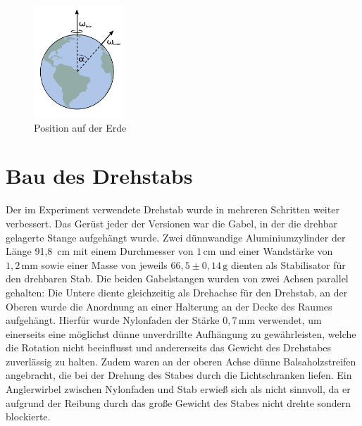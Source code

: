 \documentclass[11pt]{scrartcl}
\newcommand{\unit}[1]{\ensuremath{\,\mathrm{#1}}} %
\begin{document}
\begin{figure}[ht]
\begin{center}
\includegraphics[width=0.3\textwidth]{welt.pdf}
\end{center}
\vspace{-1.5\baselineskip}
\caption{Position auf der Erde}
\label{Welt}
\end{figure}

\section{Bau des Drehstabs} %


Der im Experiment verwendete Drehstab wurde in mehreren Schritten weiter verbessert. Das Ger\"ust jeder der Versionen war die Gabel, in der die drehbar gelagerte Stange aufgeh\"angt wurde. Zwei d\"unnwandige Aluminiumzylinder der L\"ange 91,8 \unit{cm} mit einem Durchmesser von $1\unit{cm}$ und einer Wandstärke von $1,2\unit{mm}$ sowie einer Masse von jeweils $66,5\pm 0,14\unit{g}$ dienten als Stabilisator für den drehbaren Stab. Die beiden Gabelstangen wurden von zwei Achsen parallel gehalten: Die Untere diente gleichzeitig als Drehachse f\"ur den Drehstab, an der Oberen wurde die Anordnung an einer Halterung an der Decke des Raumes aufgeh\"angt. Hierf\"ur wurde Nylonfaden der St\"arke $0,7\unit{mm}$
 verwendet, um einerseits eine m\"oglichst d\"unne unverdrillte Aufh\"angung zu gew\"ahrleisten, welche die Rotation nicht beeinflusst und andererseits das Gewicht des Drehstabes zuverl\"assig zu halten. Zudem waren an der oberen Achse d\"unne Balsaholzstreifen angebracht, die bei der Drehung des Stabes durch die Lichtschranken liefen. Ein Anglerwirbel zwischen Nylonfaden und Stab erwieß sich als nicht sinnvoll, da er aufgrund der Reibung durch das große Gewicht des Stabes nicht drehte sondern blockierte.
\end{document}
